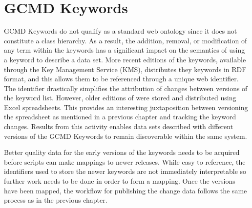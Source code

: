 \section{GCMD Keywords}
GCMD Keywords do not qualify as a standard web ontology since it does not constitute a class hierarchy.
As a result, the addition, removal, or modification of any term within the keywords has a significant impact on the semantics of using a keyword to describe a data set.
More recent editions of the keywords, available through the Key Management Service (KMS), distributes they keywords in RDF format, and this allows them to be referenced through a unique web identifier.
The identifier drastically simplifies the attribution of changes between versions of the keyword list.
However, older editions of were stored and distributed using Excel spreadsheets.
This provides an interesting juxtaposition between versioning the spreadsheet as mentioned in a previous chapter and tracking the keyword changes.
Results from this activity enables data sets described with different versions of the GCMD Keywords to remain discoverable within the same system.

Better quality data for the early versions of the keywords needs to be acquired before scripts can make mappings to newer releases.
While easy to reference, the identifiers used to store the newer keywords are not immediately interpretable so further work needs to be done in order to form a mapping.
Once the versions have been mapped, the workflow for publishing the change data follows the same process as in the previous chapter.